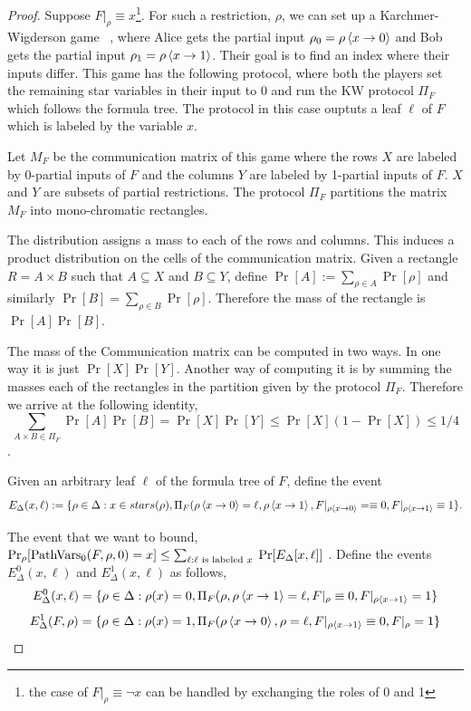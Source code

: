 \documentclass[11pt]{article}
\begin{document}
\begin{proof}
    Suppose $F|_\rho \equiv x$\footnote{the case of $F|_\rho \equiv \neg x$ can be handled by exchanging the roles of 0 and 1}. For such a restriction, $\rho$, we can set up a Karchmer-Wigderson game ~\cite{KWgame}, where Alice gets the partial input $\rho_0 = \rho \left\langle x \to 0\right\rangle$ and Bob gets the partial input $\rho_1 = \rho \left\langle x \to 1\right\rangle$. Their goal is to find an index where their inputs differ. This game has the following protocol,
    where both the players set the remaining star variables in their input to 0 and run the KW protocol $\Pi_F$ which follows the formula tree. The protocol in this case ouptuts a leaf $\ell$ of $F$ which is labeled by the variable $x$.   

    Let $M_F$ be the communication matrix of this game where the rows $X$ are labeled by 0-partial inputs of $F$ and the columns $Y$ are labeled by 1-partial inputs of $F$. $X$ and $Y$ are subsets of partial restrictions. The protocol $\Pi_F$ partitions the matrix $M_F$ into mono-chromatic rectangles. 

    The distribution assigns a mass to each of the rows and columns. This induces a product distribution on the cells of the communication matrix. 
    Given a rectangle $R = A \times B$ such that $A \subseteq X$ and $B \subseteq Y$, define $\Pr[A] := \sum_{\rho \in A} \Pr[\rho]$ and similarly $\Pr[B] = \sum_{\rho \in B} \Pr[\rho]$. Therefore the mass of the rectangle is $\Pr[A]\Pr[B]$. 

    The mass of the Communication matrix can be computed in two ways. In one way it is just $\Pr[X]\Pr[Y]$. 
    Another way of computing it is by summing the masses each of the rectangles in the partition given by the protocol $\Pi_F$. Therefore we arrive at the following identity,
    $$\sum_{A \times B \in \Pi_F} \Pr[A] \Pr [B] = \Pr[X] \Pr[Y] \leq \Pr[X](1- \Pr[X]) \leq 1/4$$.

    Given an arbitrary leaf $\ell$ of the formula tree of $F$, define the event 
    $$E_\Delta(x,\ell):= \{\rho \in \Delta: x \in stars(\rho), \Pi_F(\rho\left\langle x \to 0\right\rangle = \ell,\rho\left\langle x \to 1\right\rangle, F|_{\rho\left\langle x \to 0\right\rangle}=\equiv  0, F|_{\rho\left\langle x \to 1\right\rangle} \equiv 1 \}.$$

    The event that we want to bound, $\Pr_\rho[\operatorname{PathVars}_0(F,\rho,0) = x] \le \sum_{\ell: \ell \text{\ is\ labeled $x$\ }} \Pr[E_\Delta[x,\ell]]$ . 
    Define the events $E^0_\Delta(x,\ell)$ and $E^1_\Delta(x,\ell)$ as follows, 
    $$E^0_\Delta(x,\ell) = \{\rho \in \Delta: \rho(x) =0, \Pi_F(\rho, \rho\left\langle x \to 1\right\rangle =\ell, F|_\rho \equiv 0, F|_{\rho\left\langle x \to 1\right\rangle} = 1 \}$$
    $$E^1_\Delta(F,\rho) = \{\rho \in \Delta: \rho(x) =1, \Pi_F(\rho\left\langle x \to 0\right\rangle, \rho =\ell, F|_{\rho\left\langle x \to 1\right\rangle} \equiv 0, F|_{\rho} = 1 \}$$


\end{proof}
\end{document}
